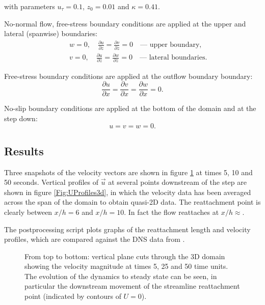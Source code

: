 with parameters $u_{\tau} = 0.1$, $z_0 = 0.01$ and $\kappa = 0.41$.

No-normal flow, free-stress boundary conditions are applied at the upper and lateral
(spanwise) boundaries:
\begin{eqnarray*}
&&w=0,\quad \frac{\partial u}{\partial z} = \frac{\partial v}{\partial z} = 0 \quad\textrm{--- upper boundary},\\
&&v=0,\quad \frac{\partial u}{\partial z} = \frac{\partial w}{\partial z} = 0 \quad\textrm{--- lateral boundaries}.
\end{eqnarray*}

Free-stress boundary conditions are applied at the outflow boundary boundary:
\begin{equation*}
\frac{\partial u}{\partial x} = \frac{\partial v}{\partial x} = \frac{\partial w}{\partial x} = 0.
\end{equation*}

No-slip boundary conditions are applied at the bottom of the domain and at the step down:
\begin{equation*}
u=v=w=0.
\end{equation*}

\subsection{Results}
Three snapshots of the velocity vectors are shown in figure \ref{Fig:velo-magnitude-3d}
at times 5, 10 and 50 seconds.
Vertical profiles of $\vec{u}$ at several points downstream of the step are shown in figure
\ref{Fig:UProfiles3d}, in which the velocity data has been averaged across the span of the domain
to obtain quasi-2D data. The reattachment point is clearly between $x/h=6$ and $x/h=10$.
In fact the flow reattaches at $x/h \approx $.

The postprocessing script plots graphs of the reattachment length
and velocity profiles, which are compared against the DNS data from \cite{le1997}.

\begin{figure}
\centering
{}
\caption{From top to bottom: vertical plane cuts through the 3D domain showing
the velocity magnitude at times 5, 25 and 50 time units.
The evolution of the dynamics to steady state can be seen, in particular the downstream movement
of the streamline reattachment point (indicated by contours of $U=0$).}
\label{Fig:velo-magnitude-3d}
\end{figure}

